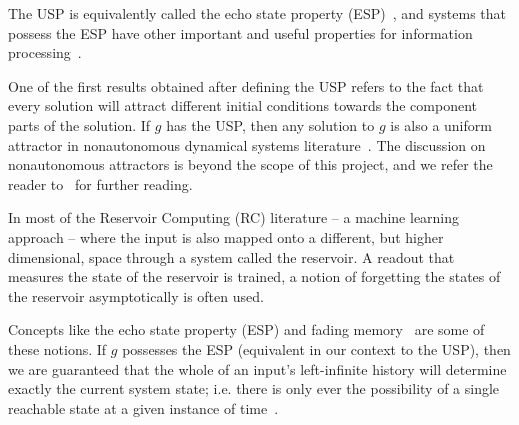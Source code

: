 The USP is equivalently called  the echo state property (ESP)~\cite{Manju_ESP}, and systems that possess the ESP have other important and useful properties for information processing~\cite{grigoryeva2018echo, grigoryeva2019differentiable, manjunath2020stability}.  

One of the first results obtained after defining the USP refers to the fact that every solution will attract different initial conditions towards the component parts of the solution.
If $g$ has the USP, then any solution to $g$ is also a uniform attractor in nonautonomous dynamical systems literature~\cite{Manju_Nonlinearity}. The discussion on nonautonomous attractors is beyond the scope of this project, and we refer the reader to~\cite{Manju_ESP, esann2012ids} for further reading. 


In most of the Reservoir Computing (RC) literature -- a machine learning approach -- where the input is also mapped onto a different, but higher dimensional, space through a system called the reservoir. A readout that measures the state of the reservoir is trained, a notion of forgetting the states of the reservoir asymptotically is often used.   %

Concepts like the echo state property (ESP) and fading memory~\cite{boyd1985fading} are some of these notions.  
If $g$ possesses the ESP (equivalent in our context to the USP), then we are guaranteed that the whole of an input's left-infinite history will determine exactly the current system state; i.e. there is only ever the possibility of a single reachable state at a given instance of time~\cite{jaeger2001echo,manjunath2020stability}.

